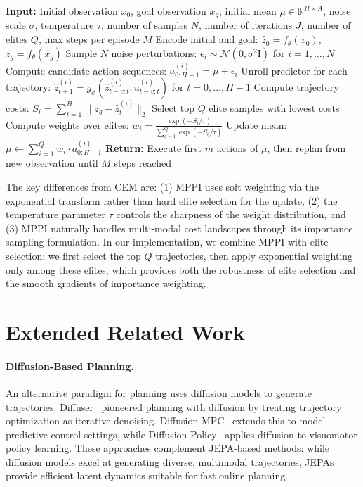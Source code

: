 \documentclass{article}
\begin{document}
\begin{algorithm}
\caption{Model Predictive Path Integral (MPPI)}
\label{algo:MPPI}
\begin{algorithmic}[1]
    \STATE \textbf{Input:} Initial observation $x_0$, goal observation $x_g$, initial mean $\mu \in \mathbb{R}^{H \times A}$, noise scale $\sigma$, temperature $\tau$, number of samples $N$, number of iterations $J$, number of elites $Q$, max steps per episode $M$
    \STATE Encode initial and goal: $\hat{z}_0 = f_\theta(x_0)$, $z_g = f_\theta(x_g)$
        \STATE Sample $N$ noise perturbations: $\epsilon_i \sim \mathcal{N}(0, \sigma^2 \textrm{I})$ for $i = 1, \ldots, N$
        \STATE Compute candidate action sequences: $a^{(i)}_{0:H-1} = \mu + \epsilon_i$
        \STATE Unroll predictor for each trajectory: $\hat{z}^{(i)}_{t+1} = g_\phi(\hat{z}^{(i)}_{t-v:t}, u^{(i)}_{t-v:t})$ for $t = 0, \ldots, H-1$
        \STATE Compute trajectory costs: $S_i = \sum_{t=1}^{H} \| z_g - \hat{z}^{(i)}_t \|_2$
        \STATE Select top $Q$ elite samples with lowest costs
        \STATE Compute weights over elites: $w_i = \frac{\exp(-S_i / \tau)}{\sum_{q=1}^{Q} \exp(-S_q / \tau)}$
        \STATE Update mean: $\mu \leftarrow \sum_{i=1}^{Q} w_i \cdot a^{(i)}_{0:H-1}$
    \ENDFOR
    \STATE \textbf{Return:} Execute first $m$ actions of $\mu$, then replan from new observation until $M$ steps reached
\end{algorithmic}
\end{algorithm}

The key differences from CEM are: (1) MPPI uses soft weighting via the exponential transform rather than hard elite selection for the update, (2) the temperature parameter $\tau$ controls the sharpness of the weight distribution, and (3) MPPI naturally handles multi-modal cost landscapes through its importance sampling formulation.
In our implementation, we combine MPPI with elite selection: we first select the top $Q$ trajectories, then apply exponential weighting only among these elites, which provides both the robustness of elite selection and the smooth gradients of importance weighting.

\section{Extended Related Work}

\paragraph{Diffusion-Based Planning.}
An alternative paradigm for planning uses diffusion models to generate trajectories.
Diffuser~\citep{Diffuser} pioneered planning with diffusion by treating trajectory optimization as iterative denoising.
Diffusion MPC~\citep{DMPC} extends this to model predictive control settings, while Diffusion Policy~\citep{chi2023diffusion} applies diffusion to visuomotor policy learning.
These approaches complement JEPA-based methods: while diffusion models excel at generating diverse, multimodal trajectories, JEPAs provide efficient latent dynamics suitable for fast online planning.
\end{document}
